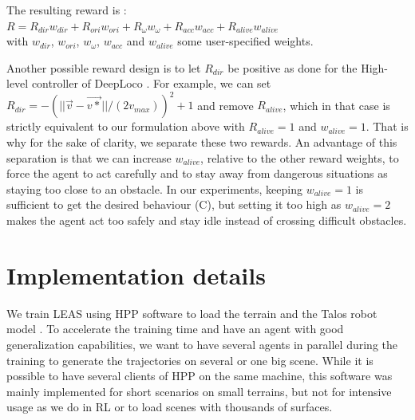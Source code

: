 The resulting reward is :\\
$R = R_{dir} w_{dir} + R_{ori} w_{ori} + R_{\omega} w_{\omega} + R_{acc} w_{acc} + R_{alive} w_{alive}$\\
with $w_{dir}$, $w_{ori}$, $w_{\omega}$, $w_{acc}$ and $w_{alive}$ some user-specified weights.

Another possible reward design is to let $R_{dir}$ be positive as done for the High-level controller of DeepLoco \cite{deepLoco}. 
For example, we can set $R_{dir}=-(||\overrightarrow{v} - \overrightarrow{v*}||/(2 v_{max}))^2 + 1$ and remove $R_{alive}$, which in that case is strictly equivalent to our formulation above with $R_{alive}=1$ and $w_{alive}=1$.
That is why for the sake of clarity, we separate these two rewards. 
An advantage of this separation is that we can increase $w_{alive}$, relative to the other reward weights, to force the agent to act carefully and to stay away from dangerous situations as staying too close to an obstacle. 
In our experiments, keeping $w_{alive}=1$ is sufficient to get the desired behaviour (C), but setting it too high as $w_{alive}=2$ makes the agent act too safely and stay idle instead of crossing difficult obstacles.

\section{Implementation details\label{subsec:leas-implementation}}


We train LEAS using HPP software \cite{HPP_software} to load the terrain and the Talos robot model \cite{talos_robot}. 
To accelerate the training time and have an agent with good generalization capabilities, we want to have several agents in parallel during the training to generate the trajectories on several or one big scene. 
While it is possible to have several clients of HPP on the same machine, this software was mainly implemented for short scenarios on small terrains, but not for intensive usage as we do in RL or to load scenes with thousands of surfaces. 

